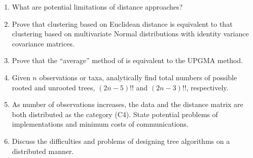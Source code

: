 \begin{enumerate}[label=\thechapter-\arabic*]

\item
What are potential limitations of distance approaches?

\item
Prove that clustering based on Euclidean distance is equivalent to that
clustering based on multivariate Normal distributions with identity variance
covariance matrices.

\item
Prove that the ``average'' method of  is equivalent to the
UPGMA method.

\item
Given $n$ observations or taxa, analytically find total numbers of possible
rooted and unrooted trees, $(2n-5)!!$ and $(2n-3)!!$, respectively.

\item
As number of observations increases, the data and the distance matrix are
both distributed as the category (C4). State potential problems of
implementations and minimum costs of communications.

\item
Discuss the difficulties and problems of designing tree algorithms on a
distributed manner.

\end{enumerate}


